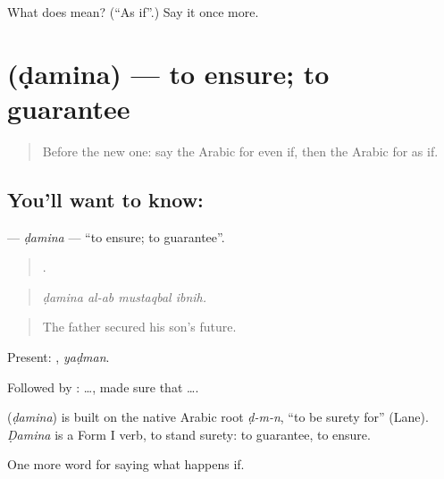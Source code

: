 \begin{tcolorbox}[breakable,colback=teal!4,colframe=teal!35!black,title={Before you move on}]
What does   mean? (\textquotedblleft{}As if\textquotedblright{}.) Say it once more.
\end{tcolorbox}
\section[\texorpdfstring{\ar{ضمن} (ḍamina)}{ضمن (ḍamina)}]{ (ḍamina) — to ensure; to guarantee}

\label{lesson:AR-C404-damina}



\begin{quote}
Before the new one: say the Arabic for even if, then the Arabic for as if.
\end{quote}

\subsection*{You'll want to know: }
\textbf{} — \emph{ḍamina} — \textquotedblleft{}to ensure; to guarantee\textquotedblright{}.

\begin{quote}
   .
\end{quote}

\begin{quote}
\emph{ḍamina al-ab mustaqbal ibnih.}
\end{quote}

\begin{quote}
The father secured his son's future.
\end{quote}

Present: , \emph{yaḍman}.

Followed by :   …, made sure that ….

\begin{cousinweb}
\textbf{} (\emph{ḍamina}) is built on the native Arabic root \emph{ḍ-m-n}, \textquotedblleft{}to be surety for\textquotedblright{} (Lane). \emph{Ḍamina} is a Form I verb, to stand surety: to guarantee, to ensure.
\end{cousinweb}

\begin{grammarlens}[title={What you've built}]
One more word for saying what happens if.
\end{grammarlens}

